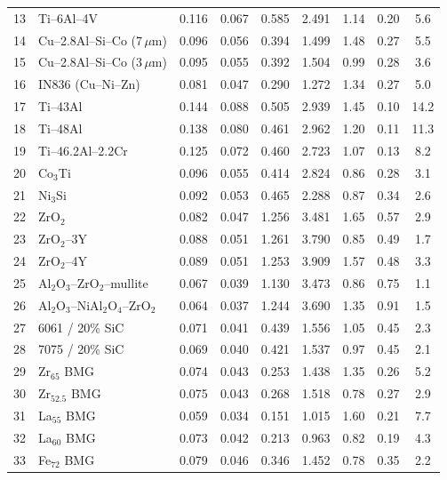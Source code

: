 \documentclass[11pt]{article}
\begin{document}
\begin{longtable}{rlccccccc}
13 & Ti--6Al--4V             & 0.116 & 0.067 & 0.585 & 2.491 & 1.14 & 0.20 & 5.6\\
14 & Cu--2.8Al--Si--Co (7\,$\mu$m) & 0.096 & 0.056 & 0.394 & 1.499 & 1.48 & 0.27 & 5.5\\
15 & Cu--2.8Al--Si--Co (3\,$\mu$m) & 0.095 & 0.055 & 0.392 & 1.504 & 0.99 & 0.28 & 3.6\\
16 & IN836 (Cu--Ni--Zn)      & 0.081 & 0.047 & 0.290 & 1.272 & 1.34 & 0.27 & 5.0\\
17 & Ti--43Al                & 0.144 & 0.088 & 0.505 & 2.939 & 1.45 & 0.10 & 14.2\\
18 & Ti--48Al                & 0.138 & 0.080 & 0.461 & 2.962 & 1.20 & 0.11 & 11.3\\
19 & Ti--46.2Al--2.2Cr       & 0.125 & 0.072 & 0.460 & 2.723 & 1.07 & 0.13 & 8.2\\
20 & Co$_3$Ti                & 0.096 & 0.055 & 0.414 & 2.824 & 0.86 & 0.28 & 3.1\\
21 & Ni$_3$Si                & 0.092 & 0.053 & 0.465 & 2.288 & 0.87 & 0.34 & 2.6\\
22 & ZrO$_2$                 & 0.082 & 0.047 & 1.256 & 3.481 & 1.65 & 0.57 & 2.9\\
23 & ZrO$_2$--3Y             & 0.088 & 0.051 & 1.261 & 3.790 & 0.85 & 0.49 & 1.7\\
24 & ZrO$_2$--4Y             & 0.089 & 0.051 & 1.253 & 3.909 & 1.57 & 0.48 & 3.3\\
25 & Al$_2$O$_3$--ZrO$_2$--mullite & 0.067 & 0.039 & 1.130 & 3.473 & 0.86 & 0.75 & 1.1\\
26 & Al$_2$O$_3$--NiAl$_2$O$_4$--ZrO$_2$ & 0.064 & 0.037 & 1.244 & 3.690 & 1.35 & 0.91 & 1.5\\
27 & 6061 / 20\% SiC         & 0.071 & 0.041 & 0.439 & 1.556 & 1.05 & 0.45 & 2.3\\
28 & 7075 / 20\% SiC         & 0.069 & 0.040 & 0.421 & 1.537 & 0.97 & 0.45 & 2.1\\
29 & Zr$_{65}$ BMG           & 0.074 & 0.043 & 0.253 & 1.438 & 1.35 & 0.26 & 5.2\\
30 & Zr$_{52.5}$ BMG         & 0.075 & 0.043 & 0.268 & 1.518 & 0.78 & 0.27 & 2.9\\
31 & La$_{55}$ BMG           & 0.059 & 0.034 & 0.151 & 1.015 & 1.60 & 0.21 & 7.7\\
32 & La$_{60}$ BMG           & 0.073 & 0.042 & 0.213 & 0.963 & 0.82 & 0.19 & 4.3\\
33 & Fe$_{72}$ BMG           & 0.079 & 0.046 & 0.346 & 1.452 & 0.78 & 0.35 & 2.2\\

\end{longtable}
\end{document}
